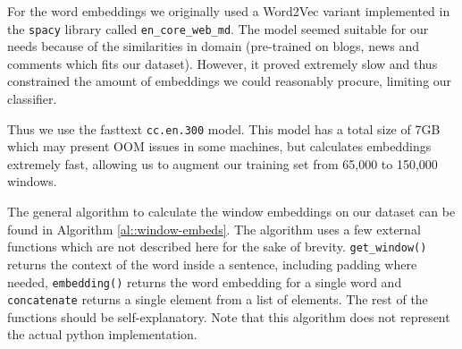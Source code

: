 \documentclass[10pt, a4paper]{article}
\begin{document}
	For the word embeddings we originally used a Word2Vec variant implemented in the \texttt{spacy} library called \texttt{en\_core\_web\_md}. The model seemed suitable for our needs because of the similarities in domain (pre-trained on blogs, news and comments which fits our dataset). However, it proved extremely slow and thus constrained the amount of embeddings we could reasonably procure, limiting our classifier.
	
	Thus we use the fasttext \texttt{cc.en.300} model. This model has a total size of 7GB which may present OOM issues in some machines, but calculates embeddings extremely fast, allowing us to augment our training set from 65,000 to 150,000 windows.
	
	The general algorithm to calculate the window embeddings on our dataset can be found in Algorithm \ref{al::window-embeds}. The algorithm uses a few external functions which are not described here for the sake of brevity. \texttt{get\_window()} returns the context of the word inside a sentence, including padding where needed, \texttt{embedding()} returns the word embedding for a single word and \texttt{concatenate} returns a single element from a list of elements. The rest of the functions should be self-explanatory.  Note that this algorithm does not represent the actual python implementation.
	
\end{document}
